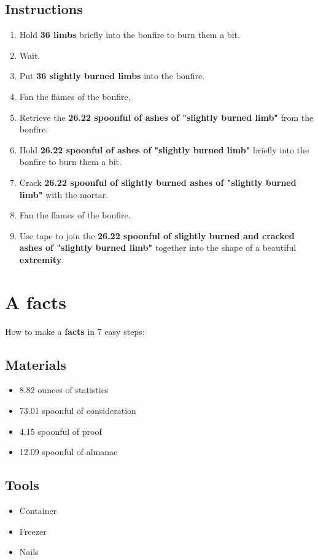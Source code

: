 \documentclass{article}
\begin{document}
\subsection{Instructions}\begin{enumerate}
\item 
Hold \textbf{36 limbs} briefly into the bonfire to burn them a bit.
\item 
Wait.
\item 
Put \textbf{36 slightly burned limbs} into the bonfire.
\item 
Fan the flames of the bonfire.
\item 
Retrieve the \textbf{26.22 spoonful of ashes of "slightly burned limb"} from the bonfire.
\item 
Hold \textbf{26.22 spoonful of ashes of "slightly burned limb"} briefly into the bonfire to burn them a bit.
\item 
Crack \textbf{26.22 spoonful of slightly burned ashes of "slightly burned limb"} with the mortar.
\item 
Fan the flames of the bonfire.
\item 
Use tape to join the \textbf{26.22 spoonful of slightly burned and cracked ashes of "slightly burned limb"} together into the shape of a beautiful \textbf{extremity}.
\end{enumerate}
\newpage
\section{A facts}How to make a \textbf{facts} in 7 easy steps:

\subsection{Materials}\begin{itemize}
\item 
8.82 ounces of statistics
\item 
73.01 spoonful of consideration
\item 
4.15 spoonful of proof
\item 
12.09 spoonful of almanac
\end{itemize}
\subsection{Tools}\begin{itemize}
\item 
Container
\item 
Freezer
\item 
Nails
\end{itemize}
\end{document}
